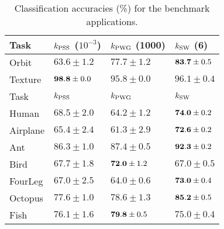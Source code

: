 \documentclass[11pt]{article}
\newcommand{\kPSS}{k_{\rm PSS}}
\newcommand{\kPWG}{k_{\rm PWG}}
\newcommand{\kSW}{k_{\rm SW}}
\begin{document}
\begin{table}[t]
\vskip 0.15in
\begin{center}
\begin{small}
\begin{sc}

\begin{tabular}{|l|lll|}
\hline 
Task &         $\kPSS$ ($10^{-3}$)&    $\kPWG$ (1000) &                   $\kSW$ (6)                                  \\
\hline 
Orbit &        $63.6\pm1.2$ &          $77.7\pm1.2$ &                     ${\bf 83.7}\pm0.5$                           \\        
Texture &      ${\bf 98.8}\pm 0.0$ &   $95.8\pm0.0$ &                     $96.1\pm0.4$                          \\                                           
\hline 
Task &         $\kPSS$ &               $\kPWG$ &                          $\kSW$                           \\
\hline 
Human &        $68.5\pm2.0$ &          $64.2\pm1.2$ &                     ${\bf 74.0}\pm0.2 $ \\
Airplane &     $65.4\pm2.4$ &          $61.3\pm2.9$ &                     ${\bf 72.6}\pm0.2$  \\
Ant &          $86.3\pm1.0$ &          $87.4\pm0.5$ &                     ${\bf 92.3}\pm0.2$  \\
Bird &         $67.7\pm1.8$ &          ${\bf72.0}\pm1.2$ &                $67.0\pm0.5$  \\
FourLeg &      $67.0\pm2.5$ &          $64.0\pm0.6$ &                     ${\bf73.0}\pm0.4$ \\
Octopus &      $77.6\pm1.0$ &          $78.6\pm1.3$ &                     ${\bf85.2}\pm0.5$  \\
Fish &         $76.1\pm1.6$ &          ${\bf79.8}\pm0.5$ &                $75.0\pm0.4$ \\
\hline                                                            
\end{tabular}
\end{sc}
\end{small}

\caption{\label{table:Acc} Classification accuracies (\%) for the benchmark applications.}
\end{center}
\vskip -0.1in
\end{table}
\end{document}
